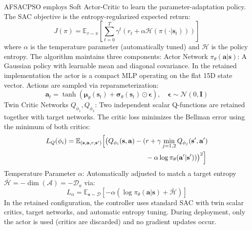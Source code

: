 \documentclass[final,5p,times]{elsarticle}
\newcommand{\symActiondim}{\mathcal{D}_a}
\newcommand{\symGamma}{\gamma}
\begin{document}
AFSACPSO employs Soft Actor-Critic \cite{Haarnoja2018Soft} to learn the parameter-adaptation policy.
The SAC objective is the entropy-regularized expected return:
\begin{equation}
J(\pi) = \mathbb{E}_{\tau \sim \pi}\left[\sum_{t=0}^{T} \gamma^t \left(r_t + \alpha \mathcal{H}(\pi(\cdot|\mathbf{s}_t))\right)\right]
\label{eq:sac_objective}
\end{equation} where $\alpha$ is the temperature parameter (automatically tuned) and $\mathcal{H}$ is the policy entropy.
The algorithm maintains three components: Actor Network $\pi_\theta(\mathbf{a}|\mathbf{s})$: A Gaussian policy with learnable mean and diagonal covariance. In the retained implementation the actor is a compact MLP operating on the flat 15D state vector. Actions are sampled via reparameterization:
\begin{equation}
\mathbf{a}_t = \tanh(\boldsymbol{\mu}_\theta(\mathbf{s}_t) + \boldsymbol{\sigma}_\theta(\mathbf{s}_t) \odot \boldsymbol{\epsilon}), \quad \boldsymbol{\epsilon} \sim \mathcal{N}(0, \mathbf{I})
\end{equation} Twin Critic Networks $Q_{\phi_1}, Q_{\phi_2}$: Two independent scalar Q-functions are retained together with target networks. The critic loss minimizes the Bellman error using the minimum of both critics:
\begin{equation}
\begin{aligned}
L_Q(\phi_i) = \mathbb{E}_{(\mathbf{s},\mathbf{a},r,\mathbf{s}')} \Bigl[ \bigl(Q_{\phi_i}(\mathbf{s}, \mathbf{a}) - (&r + \symGamma \min_{j=1,2} Q_{\phi_j}(\mathbf{s}', \mathbf{a}') \\
&- \alpha \log \pi_\theta(\mathbf{a}'|\mathbf{s}') )\bigr)^2 \Bigr]
\end{aligned}
\end{equation} Temperature Parameter $\alpha$: Automatically adjusted to match a target entropy $\bar{\mathcal{H}} = -\dim(\mathcal{A}) = -\symActiondim$ via:
\begin{equation}
L_\alpha = \mathbb{E}_{\mathbf{s} \sim \mathcal{D}}\left[-\alpha \left(\log \pi_\theta(\mathbf{a}|\mathbf{s}) + \bar{\mathcal{H}}\right)\right]
\end{equation} In the retained configuration, the controller uses standard SAC with twin scalar critics, target networks, and automatic entropy tuning.
During deployment, only the actor is used (critics are discarded) and no gradient updates occur.
\end{document}
